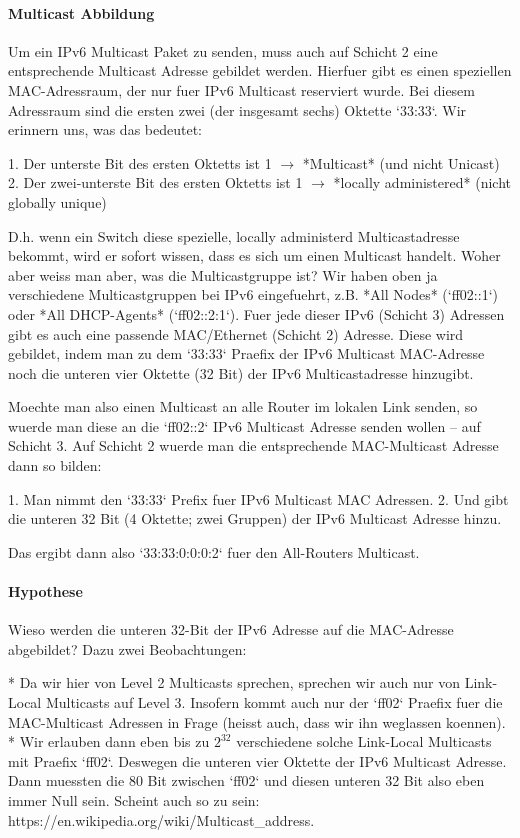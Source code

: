 \paragraph{Multicast Abbildung} 

Um ein IPv6 Multicast Paket zu senden, muss auch auf Schicht 2 eine
entsprechende Multicast Adresse gebildet werden. Hierfuer gibt es einen
speziellen MAC-Adressraum, der nur fuer IPv6 Multicast reserviert wurde. Bei
diesem Adressraum sind die ersten zwei (der insgesamt sechs) Oktette
`33:33`. Wir erinnern uns, was das bedeutet:

1. Der unterste Bit des ersten Oktetts ist 1 $\rightarrow$ *Multicast* (und nicht
   Unicast)
2. Der zwei-unterste Bit des ersten Oktetts ist 1 $\rightarrow$ *locally
   administered* (nicht globally unique)

D.h. wenn ein Switch diese spezielle, locally administerd Multicastadresse
bekommt, wird er sofort wissen, dass es sich um einen Multicast handelt. Woher
aber weiss man aber, was die Multicastgruppe ist? Wir haben oben ja verschiedene
Multicastgruppen bei IPv6 eingefuehrt, z.B. *All Nodes* (`ff02::1`) oder *All
DHCP-Agents* (`ff02::2:1`). Fuer jede dieser IPv6 (Schicht 3) Adressen gibt es
auch eine passende MAC/Ethernet (Schicht 2) Adresse. Diese wird gebildet, indem
man zu dem `33:33` Praefix der IPv6 Multicast MAC-Adresse noch die unteren vier
Oktette (32 Bit) der IPv6 Multicastadresse hinzugibt.

Moechte man also einen Multicast an alle Router im lokalen Link senden, so
wuerde man diese an die `ff02::2` IPv6 Multicast Adresse senden wollen -- auf
Schicht 3. Auf Schicht 2 wuerde man die entsprechende MAC-Multicast Adresse dann
so bilden:

1. Man nimmt den `33:33` Prefix fuer IPv6 Multicast MAC Adressen.
2. Und gibt die unteren 32 Bit (4 Oktette; zwei Gruppen) der IPv6 Multicast
   Adresse hinzu.

Das ergibt dann also `33:33:0:0:0:2` fuer den All-Routers Multicast.

\paragraph{Hypothese} 

Wieso werden die unteren 32-Bit der IPv6 Adresse auf die MAC-Adresse abgebildet?
Dazu zwei Beobachtungen:

* Da wir hier von Level 2 Multicasts sprechen, sprechen wir auch nur von
  Link-Local Multicasts auf Level 3. Insofern kommt auch nur der `ff02` Praefix
  fuer die MAC-Multicast Adressen in Frage (heisst auch, dass wir ihn weglassen
  koennen).
* Wir erlauben dann eben bis zu $2^{32}$ verschiedene solche Link-Local
  Multicasts mit Praefix `ff02`. Deswegen die unteren vier Oktette der IPv6
  Multicast Adresse. Dann muessten die 80 Bit zwischen `ff02` und diesen unteren
  32 Bit also eben immer Null sein. Scheint auch so zu sein:
  https://en.wikipedia.org/wiki/Multicast\_address.

